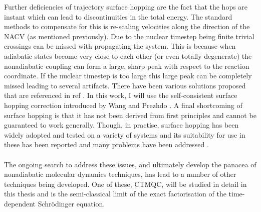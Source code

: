 Further deficiencies of trajectory surface hopping are the fact that the hops are instant which can lead to discontinuities in the total energy. The standard methods to compensate for this is re-scaling velocities along the direction of the NACV (as mentioned previously). Due to the nuclear timestep being finite trivial crossings can be missed with propagating the system. This is because when adiabatic states become very close to each other (or even totally degenerate) the nonadiabatic coupling can form a large, sharp peak with respect to the reaction coordinate. If the nuclear timestep is too large this large peak can be completely missed leading to several artifacts. There have been various solutions proposed that are referenced in ref \cite{Carof2017FSSH, Wang2016}. In this work, I will use the self-consistent surface hopping correction introduced by Wang and Prezhdo \cite{Wang2014}.  A final shortcoming of surface hopping is that it has not been derived from first principles and cannot be guaranteed to work generally. Though, in practise, surface hopping has been widely adopted and tested on a variety of systems and its suitability for use in these has been reported and many problems have been addressed \cite{Wang2016}.
\\\\
The ongoing search to address these issues, and ultimately develop the panacea of nonadiabatic molecular dynamics techniques, has lead to a number of other techniques being developed. One of these, CTMQC, will be studied in detail in this thesis and is the semi-classical limit of the exact factorisation of the time-dependent Schr\"odinger equation.
